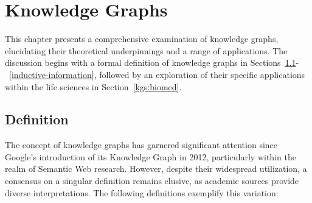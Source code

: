\chapter{Knowledge Graphs}\label{kgs}
This chapter presents a comprehensive examination of knowledge graphs, elucidating their theoretical underpinnings and a range of applications. The discussion begins with a formal definition of knowledge graphs in Sections~\ref{definition}-~\ref{inductive-information}, followed by an exploration of their specific applications within the life sciences in Section~\ref{kgs:biomed}.

\section{Definition}\label{definition}
The concept of knowledge graphs has garnered significant attention since Google's introduction of its Knowledge Graph in 2012, particularly within the realm of Semantic Web research. However, despite their widespread utilization, a consensus on a singular definition remains elusive, as academic sources provide diverse interpretations. The following definitions exemplify this variation:

